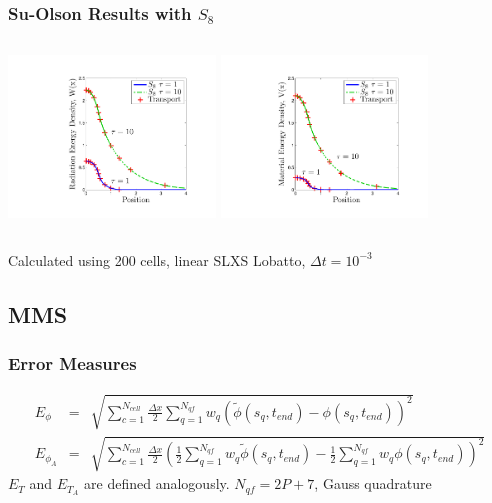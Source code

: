 \documentclass{beamer}
\newcommand{\bea}{\begin{eqnarray*}}  %
\newcommand{\eea}{\end{eqnarray*}}
\begin{document}
\begin{frame}
\frametitle{Su-Olson Results with $S_8$}
\begin{columns}[t]
\centering
\includegraphics[width=5.5cm,trim=1.75in  0.5in 0.75in 0.5in,clip=true]{../chapter6_grey_radtran/Dissertation_Data/Su_Olson_S8_Radiation_Energy.pdf}
\centering
\includegraphics[width=5.5cm,trim=1.75in  0.5in 0.75in 0.5in,clip=true]{../chapter6_grey_radtran/Dissertation_Data/Su_Olson_S8_Material_Energy.pdf}
\end{columns}
Calculated using 200 cells, linear SLXS Lobatto, $\Delta t = 10^{-3}$
\end{frame}

\subsection{MMS}

\begin{frame}
\frametitle{Error Measures}
\bea
E_{\phi} &=& \sqrt{\sum_{c=1}^{N_{cell}}{ \frac{\Delta x}{2} \sum_{q=1}^{N_{qf}}{ w_q \left(\widetilde{\phi}(s_q , t_{end}) - \phi(s_q,t_{end})  \right)^2 } } } \\
E_{\phi_A} &=& \sqrt{
\sum_{c=1}^{N_{cell}}{ 
\frac{\Delta x}{2} 
\left( 
\frac{1}{2}\sum_{q=1}^{N_{qf}}{ w_q \widetilde{\phi}(s_q , t_{end})}  - \frac{1}{2}\sum_{q=1}^{N_{qf}}{ w_q \phi(s_q , t_{end})} 
\right)^2 
} 
} 
\eea
\vspace{0.2in}
$E_T$ and $E_{T_A}$ are defined analogously.  $N_{qf} = 2P+ 7$, Gauss quadrature
\end{frame}
\end{document}
